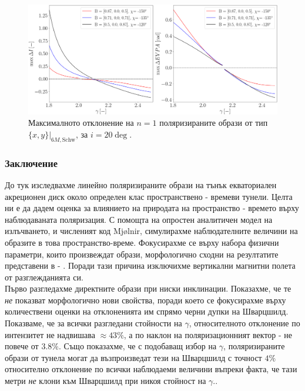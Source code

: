 \begin{figure}[!htb]
	\centering
	\includegraphics[scale = 0.25]{WH_20_deg_param_sweep_n1.png}
	\caption[Максималното отклонение на $n=1$ поляризираните образи от тип $\{x,y\}\vert_{6M, \text{Schw}}$, за $i = 20\deg$]{\small Максималното отклонение на $n=1$ поляризираните образи от тип $\{x,y\}\vert_{6M, \text{Schw}}$, за $i = 20\deg$.} 
	\label{WH_max_deviation_20_deg_n1}
\end{figure}
\newpage

\subsubsection{Заключение}

До тук изследвахме линейно поляризираните образи на тънък екваториален акреционен диск около определен клас пространствено - времеви тунели. Целта ни е да дадем оценка за влиянието на природата на пространство - времето върху наблюдаваната поляризация. С помощта на опростен аналитичен модел на излъчването, и численият код Mjølnir, симулирахме наблюдателните величини на образите в това пространство-време. Фокусирахме се върху набора физични параметри, които произвеждат образи, морфологично сходни на резултатите представени в \cite{EHT_M87_I} - \cite{EHT_M87_VIII}. Поради тази причина изключихме вертикални магнитни полета от разглежданията си.\\

Първо разгледахме директните образи при ниски инклинации. Показахме, че те \emph{не} показват морфологично нови свойства, поради което се фокусирахме върху количествени оценки на отклоненията им спрямо черни дупки на Шварцшилд. Показваме, че за всички разгледани стойности на $\gamma$, относителното отклонение по интензитет не надвишава $\approx 43\%$, а по наклон на поляризационният вектор - не повече от $3.8\%$. Също показахме, че с подобаващ избор на $\gamma$, поляризираните образи от тунела могат да възпроизведат тези на Шварцшилд с точност $4\%$ относително отклонение по всички наблюдаеми величини въпреки факта, че тази метри \emph{не} клони към Шварцшилд при никоя стойност на $\gamma$.. \\


